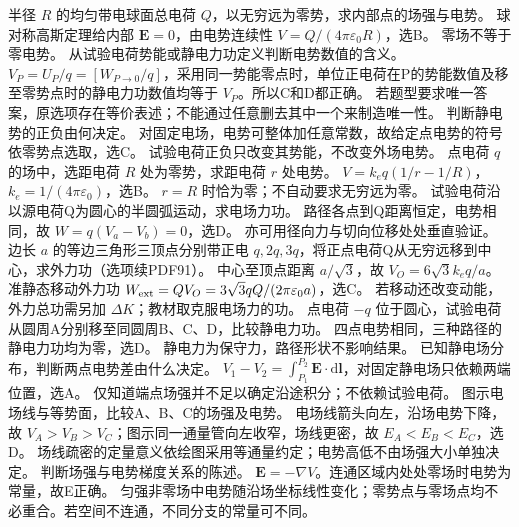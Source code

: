 \problemtext 半径 $R$ 的均匀带电球面总电荷 $Q$，以无穷远为零势，求内部点的场强与电势。
\workings 球对称高斯定理给内部 $\bm E=0$，由电势连续性 $V=Q/(4\pi\varepsilon_0R)$，选B。
\crosscheck 零场不等于零电势。
\problemtext 从试验电荷势能或静电力功定义判断电势数值的含义。
\workings $V_P=U_P/q=[W_{P\to 0}/q]$，采用同一势能零点时，单位正电荷在P的势能数值及移至零势点时的静电力功数值均等于 $V_P$。所以C和D都正确。
\crosscheck 若题型要求唯一答案，原选项存在等价表述；不能通过任意删去其中一个来制造唯一性。
\problemtext 判断静电势的正负由何决定。
\workings 对固定电场，电势可整体加任意常数，故给定点电势的符号依零势点选取，选C。
\crosscheck 试验电荷正负只改变其势能，不改变外场电势。
\problemtext 点电荷 $q$ 的场中，选距电荷 $R$ 处为零势，求距电荷 $r$ 处电势。
\workings $V=k_eq(1/r-1/R)$，$k_e=1/(4\pi\varepsilon_0)$，选B。
\crosscheck $r=R$ 时恰为零；不自动要求无穷远为零。
\problemtext 试验电荷沿以源电荷Q为圆心的半圆弧运动，求电场力功。
\workings 路径各点到Q距离恒定，电势相同，故 $W=q(V_a-V_b)=0$，选D。
\crosscheck 亦可用径向力与切向位移处处垂直验证。
\problemtext 边长 $a$ 的等边三角形三顶点分别带正电 $q,2q,3q$，将正点电荷Q从无穷远移到中心，求外力功（选项续PDF91）。
\workings 中心至顶点距离 $a/\sqrt3$，故 $V_O=6\sqrt3k_eq/a$。准静态移动外力功 $W_{\rm ext}=QV_O=3\sqrt3qQ/(2\pi\varepsilon_0a)$，选C。
\crosscheck 若移动还改变动能，外力总功需另加 $\Delta K$；教材取克服电场力的功。
\problemtext 点电荷 $-q$ 位于圆心，试验电荷从圆周A分别移至同圆周B、C、D，比较静电力功。
\workings 四点电势相同，三种路径的静电力功均为零，选D。
\crosscheck 静电力为保守力，路径形状不影响结果。
\problemtext 已知静电场分布，判断两点电势差由什么决定。
\workings $V_1-V_2=\int_{P_1}^{P_2}\bm E\cdot\mathrm d\bm l$，对固定静电场只依赖两端位置，选A。
\crosscheck 仅知道端点场强并不足以确定沿途积分；不依赖试验电荷。
\problemtext 图示电场线与等势面，比较A、B、C的场强及电势。
\workings 电场线箭头向左，沿场电势下降，故 $V_A>V_B>V_C$；图示同一通量管向左收窄，场线更密，故 $E_A<E_B<E_C$，选D。
\crosscheck 场线疏密的定量意义依绘图采用等通量约定；电势高低不由场强大小单独决定。
\problemtext 判断场强与电势梯度关系的陈述。
\workings $\bm E=-\nabla V$。连通区域内处处零场时电势为常量，故E正确。
\crosscheck 匀强非零场中电势随沿场坐标线性变化；零势点与零场点均不必重合。若空间不连通，不同分支的常量可不同。
